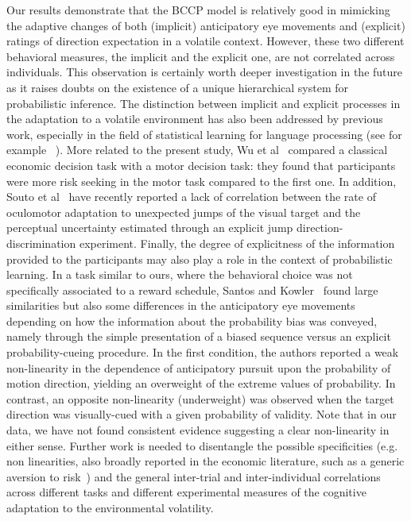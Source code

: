\documentclass[10pt,letterpaper]{article}
\newcommand{\citep}[1]{\cite{#1}}
\newcommand{\citet}[1]{\cite{#1}}
\begin{document}
Our results demonstrate that the BCCP model is relatively good in mimicking the adaptive changes of both (implicit) anticipatory eye movements and (explicit) ratings of direction expectation in a volatile context. However, these two different behavioral measures, the implicit and the explicit one, are not correlated across individuals. This observation is certainly worth deeper investigation in the future as it raises doubts on the existence of a unique hierarchical system for probabilistic inference. The distinction between implicit and explicit processes in the adaptation to a volatile environment has also been addressed by previous work, especially in the field of statistical learning for language processing (see for example ~\citet{Batterink_etal_2015,SaffranAslinNewport1996}). More related to the present study, Wu et al~\citet{WuDelgadoMaloney2012} compared a classical economic decision task with a motor decision task: they found that participants were more risk seeking in the motor task compared to the first one. In addition, Souto et al~\citet{SoutoGegenfurtnerSchuetz2016} have recently reported a lack of correlation between the rate of oculomotor adaptation to unexpected jumps of the visual target and the perceptual uncertainty estimated through an explicit jump direction-discrimination experiment. Finally, the degree of explicitness of the information provided to the participants may also play a role in the context of probabilistic learning. In a task similar to ours, where the behavioral choice was not specifically associated to a reward schedule, Santos and Kowler~\citet{SantosKowler2017} found large similarities but also some differences in the anticipatory eye movements depending on how the information about the probability bias was conveyed, namely through the simple presentation of a biased sequence versus an explicit probability-cueing procedure. In the first condition, the authors reported a weak non-linearity in the dependence of anticipatory pursuit upon the probability of motion direction, yielding an overweight of the extreme values of probability. In contrast, an opposite non-linearity (underweight) was observed when the target direction was visually-cued with a given probability of validity. Note that in our data, we have not found consistent evidence suggesting a clear non-linearity in either sense. Further work is needed to disentangle the possible specificities (e.g. non linearities, also broadly reported in the economic literature, such as a generic aversion to risk~\citep{Kahneman13}) and the general inter-trial and inter-individual correlations across different tasks and different experimental measures of the cognitive adaptation to the environmental volatility.
\end{document}
